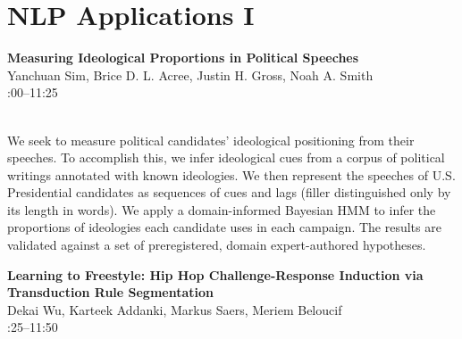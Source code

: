 \documentclass[twoside,makeidx]{book}
\renewcommand{\normalsize}{\fontsize{8}{9}\selectfont}
\renewcommand{\small}{\fontsize{7}{8}\selectfont}
\begin{document}
\section{NLP Applications I}
\vspace{-1em}
\par\vspace{2em}\noindent%
\begin{minipage}{\linewidth}%
\begin{center}
\textbf{\normalsize Measuring Ideological Proportions in Political Speeches}\\
\normalsize  Yanchuan Sim,  Brice D. L. Acree,  Justin H. Gross,  Noah A. Smith\\
{\small 11:00--11:25}\\
\end{center}
\end{minipage}\\[0.5em]
\nopagebreak%
\noindent%
{\small We seek to measure political candidates' ideological positioning from their speeches.  To accomplish this, we infer ideological cues from a corpus of political writings annotated with known ideologies.  We then represent the speeches of U.S. Presidential candidates as sequences of cues and lags (filler distinguished only by its length in words).  We apply a domain-informed Bayesian HMM to infer the proportions of ideologies each candidate uses in each campaign.  The results are validated against a set of preregistered, domain expert-authored hypotheses.}
\par\vspace{2em}\noindent%
\begin{minipage}{\linewidth}%
\begin{center}
\textbf{\normalsize Learning to Freestyle: Hip Hop Challenge-Response Induction via Transduction Rule Segmentation}\\
\normalsize  Dekai Wu,  Karteek Addanki,  Markus Saers,  Meriem Beloucif\\
{\small 11:25--11:50}\\
\end{center}
\end{minipage}\\[0.5em]
\nopagebreak%
\noindent%
\end{document}
